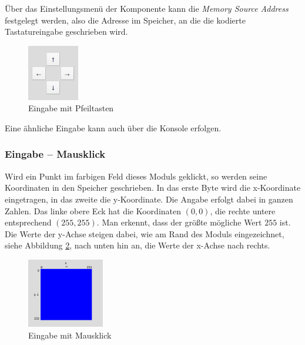 Über das Einstellungsmenü der Komponente kann die \textit{Memory Source Address} festgelegt werden, also die Adresse im Speicher, an die die kodierte Tastatureingabe geschrieben wird.

\begin{figure}[ht]
	\centering
	\includegraphics[width=0.2\textwidth]{Images/Joystick}
	\caption{Eingabe mit Pfeiltasten}
	\label{Joystick}
\end{figure}
Eine ähnliche Eingabe kann auch über die Konsole erfolgen.


\subsubsection{Eingabe -- Mausklick}
Wird ein Punkt im farbigen Feld dieses Moduls geklickt, so werden seine Koordinaten in den Speicher geschrieben. In das erste Byte wird die x-Koordinate eingetragen, in das zweite die y-Koordinate. Die Angabe erfolgt dabei in ganzen Zahlen. Das linke obere Eck hat die Koordinaten $(0, 0)$, die rechte untere entsprechend $(255, 255)$. Man erkennt, dass der größte mögliche Wert $255$ ist. Die Werte der y-Achse steigen dabei, wie am Rand des Moduls eingezeichnet, siehe Abbildung \ref{MouseArea}, nach unten hin an, die Werte der x-Achse nach rechts.
\begin{figure}[ht]
	\centering
	\includegraphics[width=0.3\textwidth]{Images/MouseArea}
	\caption{Eingabe mit Mausklick}
	\label{MouseArea}
\end{figure}

